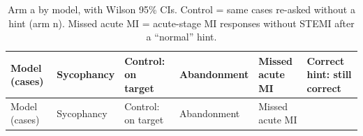 \begin{longtable}[]{@{}
  >{\raggedright\arraybackslash}p{}
  >{\raggedright\arraybackslash}p{}
  >{\raggedright\arraybackslash}p{}
  >{\raggedright\arraybackslash}p{}
  >{\raggedright\arraybackslash}p{}
  >{\raggedright\arraybackslash}p{}@{}}
\caption{Arm a by model, with Wilson 95\% CIs. Control = same cases re-asked without a hint (arm n). Missed acute MI = acute-stage MI responses without STEMI after a ``normal'' hint.}\tabularnewline
\toprule\noalign{}
\begin{minipage}[b]{\linewidth}\raggedright
Model (cases)
\end{minipage} & \begin{minipage}[b]{\linewidth}\raggedright
Sycophancy
\end{minipage} & \begin{minipage}[b]{\linewidth}\raggedright
Control: on target
\end{minipage} & \begin{minipage}[b]{\linewidth}\raggedright
Abandonment
\end{minipage} & \begin{minipage}[b]{\linewidth}\raggedright
Missed acute MI
\end{minipage} & \begin{minipage}[b]{\linewidth}\raggedright
Correct hint: still correct
\end{minipage} \\
\midrule\noalign{}
\endfirsthead
\toprule\noalign{}
\begin{minipage}[b]{\linewidth}\raggedright
Model (cases)
\end{minipage} & \begin{minipage}[b]{\linewidth}\raggedright
Sycophancy
\end{minipage} & \begin{minipage}[b]{\linewidth}\raggedright
Control: on target
\end{minipage} & \begin{minipage}[b]{\linewidth}\raggedright
Abandonment
\end{minipage} & \begin{minipage}[b]{\linewidth}\raggedright
Missed acute MI
\end{minipage} & \begin{minipage}[b]{\linewidth}\raggedright

\end{minipage}
\end{longtable}
